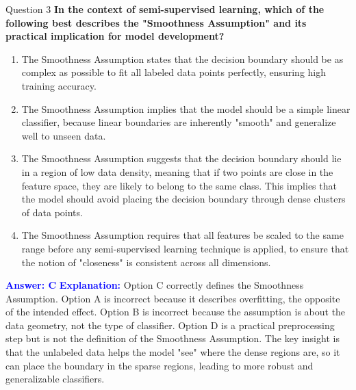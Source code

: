 \documentclass{beamer}
\begin{document}
	\begin{frame}{Question 3}
		\textbf{In the context of semi-supervised learning, which of the following best describes the "Smoothness Assumption" and its practical implication for model development?}
		\begin{enumerate}
			\item The Smoothness Assumption states that the decision boundary should be as complex as possible to fit all labeled data points perfectly, ensuring high training accuracy.
			\item The Smoothness Assumption implies that the model should be a simple linear classifier, because linear boundaries are inherently "smooth" and generalize well to unseen data.
			\item The Smoothness Assumption suggests that the decision boundary should lie in a region of low data density, meaning that if two points are close in the feature space, they are likely to belong to the same class. This implies that the model should avoid placing the decision boundary through dense clusters of data points.
			\item The Smoothness Assumption requires that all features be scaled to the same range before any semi-supervised learning technique is applied, to ensure that the notion of "closeness" is consistent across all dimensions.
		\end{enumerate}
		\vspace{0.2cm}
		\textcolor{blue}{\textbf{Answer: C}}
		\vspace{0.2cm}
		\textcolor{blue}{\textbf{Explanation:}} Option C correctly defines the Smoothness Assumption. Option A is incorrect because it describes overfitting, the opposite of the intended effect. Option B is incorrect because the assumption is about the data geometry, not the type of classifier. Option D is a practical preprocessing step but is not the definition of the Smoothness Assumption. The key insight is that the unlabeled data helps the model "see" where the dense regions are, so it can place the boundary in the sparse regions, leading to more robust and generalizable classifiers.
	\end{frame}
	
\end{document}
